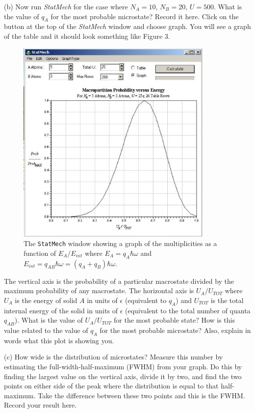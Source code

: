 (b) Now run {\it StatMech} for the case where $N_A = 10$, $N_B=20$, $U = 500$.
What is the value of $q_A$ for the most probable microstate? 
Record it here.
Click on the button at the top of the {\it StatMech} window and choose graph.
You will see a graph of the table  and it should look something like
Figure 3.
\begin{figure}[h!]
\begin{center}
\includegraphics[height=4.0in]{statmech2.eps}
\caption{The {\tt StatMech} window showing a graph of the multiplicities as a function
of $E_A/E_{int}$ where $E_A = q_A \hbar \omega$ and 
$E_{int} = q_{AB} \hbar \omega = (q_A+q_B)\hbar \omega$.}
\end{center}
\end{figure}
The vertical axis is the probability of a particular macrostate divided by the maximum
probability of any macrostate.
The horizontal axis is  $U_A/U_{TOT}$ where 
$U_A$ is the energy of solid $A$ in units of $\epsilon$ (equivalent to $q_A$) and $U_{TOT}$ is the total
internal energy of the solid in units of $\epsilon$ (equivalent 
to the total number of quanta $q_{AB}$).
What is the value of $U_A/U_{TOT}$ for the most probable state?
How is this value related to the value of $q_A$ for the most probable microstate? 
Also, explain in words what this plot is showing you.
\vspace{25mm}

(c) How wide is the distribution of microstates?
Measure this number by estimating the full-width-half-maximum (FWHM) from your graph.
Do this by finding the largest value on the vertical axis, divide it by two, and find
the two points on either side of the peak where the distribution is equal to that
half-maximum.
Take the difference between these two points and this is the FWHM.
Record your result here.
\vspace{15mm}

